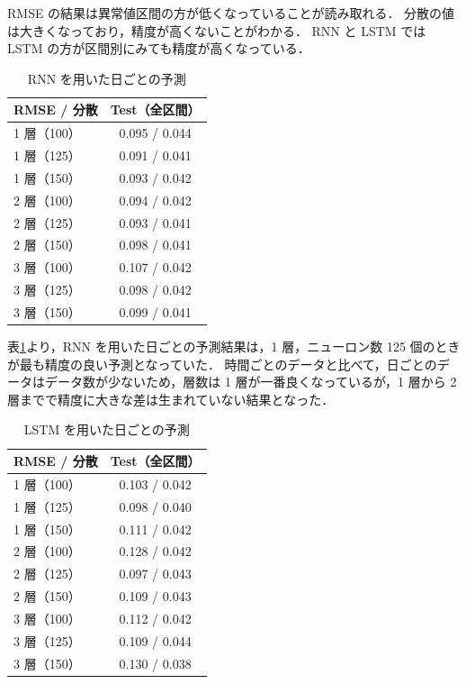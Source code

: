 \documentclass[twocolumn,fleqn,10pt]{jarticle}
\begin{document}
RMSE の結果は異常値区間の方が低くなっていることが読み取れる．
分散の値は大きくなっており，精度が高くないことがわかる．
RNN と LSTM では LSTM の方が区間別にみても精度が高くなっている．






\begin{table}[t]
\centering
  \caption{RNN を用いた日ごとの予測}
  \vspace{3mm}
  \begin{tabular}{|l||c|}  \hline
    RMSE / 分散 & Test（全区間） \\ \hline \hline
    1 層（100） & 0.095 / 0.044 \\ \hline
    1 層（125） & 0.091 / 0.041 \\ \hline
    1 層（150） & 0.093 / 0.042 \\ \hline

    2 層（100） & 0.094 / 0.042 \\ \hline
    2 層（125） & 0.093 / 0.041 \\ \hline
    2 層（150） & 0.098 / 0.041 \\ \hline

    3 層（100） & 0.107 / 0.042 \\ \hline
    3 層（125） & 0.098 / 0.042 \\ \hline
    3 層（150） & 0.099 / 0.041 \\ \hline
  \end{tabular}
  \label{tab:rnn-day}
\end{table}


表\ref{tab:rnn-day}より，RNN を用いた日ごとの予測結果は，1 層，ニューロン数 125 個のときが最も精度の良い予測となっていた．
時間ごとのデータと比べて，日ごとのデータはデータ数が少ないため，層数は 1 層が一番良くなっているが，1 層から 2 層までで精度に大きな差は生まれていない結果となった．





\begin{table}[t]
\centering
  \caption{LSTM を用いた日ごとの予測}
  \vspace{3mm}
  \begin{tabular}{|l||c|}  \hline
    RMSE / 分散 & Test（全区間） \\ \hline \hline
    1 層（100） & 0.103 / 0.042 \\ \hline
    1 層（125） & 0.098 / 0.040 \\ \hline
    1 層（150） & 0.111 / 0.042 \\ \hline

    2 層（100） & 0.128 / 0.042 \\ \hline
    2 層（125） & 0.097 / 0.043 \\ \hline
    2 層（150） & 0.109 / 0.043 \\ \hline

    3 層（100） & 0.112 / 0.042 \\ \hline
    3 層（125） & 0.109 / 0.044 \\ \hline
    3 層（150） & 0.130 / 0.038 \\ \hline
  \end{tabular}
  \label{tab:lstm-day}
\end{table}
\end{document}
